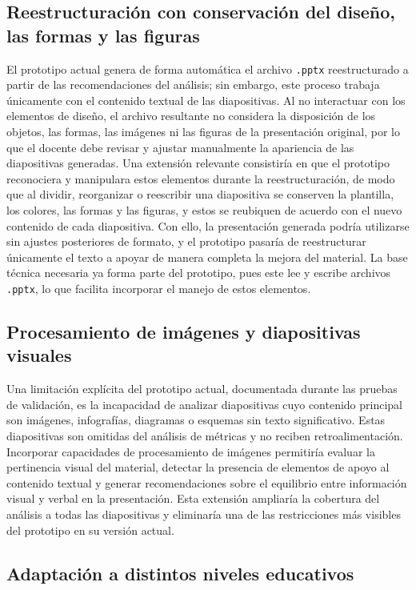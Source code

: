 \documentclass[11pt]{article}
\begin{document}
\subsection*{Reestructuración con conservación del diseño, las formas y las figuras}

El prototipo actual genera de forma automática el archivo \texttt{.pptx} reestructurado a partir de las recomendaciones del análisis; sin embargo, este proceso trabaja únicamente con el contenido textual de las diapositivas. Al no interactuar con los elementos de diseño, el archivo resultante no considera la disposición de los objetos, las formas, las imágenes ni las figuras de la presentación original, por lo que el docente debe revisar y ajustar manualmente la apariencia de las diapositivas generadas. Una extensión relevante consistiría en que el prototipo reconociera y manipulara estos elementos durante la reestructuración, de modo que al dividir, reorganizar o reescribir una diapositiva se conserven la plantilla, los colores, las formas y las figuras, y estos se reubiquen de acuerdo con el nuevo contenido de cada diapositiva. Con ello, la presentación generada podría utilizarse sin ajustes posteriores de formato, y el prototipo pasaría de reestructurar únicamente el texto a apoyar de manera completa la mejora del material. La base técnica necesaria ya forma parte del prototipo, pues este lee y escribe archivos \texttt{.pptx}, lo que facilita incorporar el manejo de estos elementos.
\subsection*{Procesamiento de imágenes y diapositivas visuales}

Una limitación explícita del prototipo actual, documentada durante las pruebas de validación, es la incapacidad de analizar diapositivas cuyo contenido principal son imágenes, infografías, diagramas o esquemas sin texto significativo. Estas diapositivas son omitidas del análisis de métricas y no reciben retroalimentación. Incorporar capacidades de procesamiento de imágenes permitiría evaluar la pertinencia visual del material, detectar la presencia de elementos de apoyo al contenido textual y generar recomendaciones sobre el equilibrio entre información visual y verbal en la presentación. Esta extensión ampliaría la cobertura del análisis a todas las diapositivas y eliminaría una de las restricciones más visibles del prototipo en su versión actual.

\subsection*{Adaptación a distintos niveles educativos}
\end{document}
